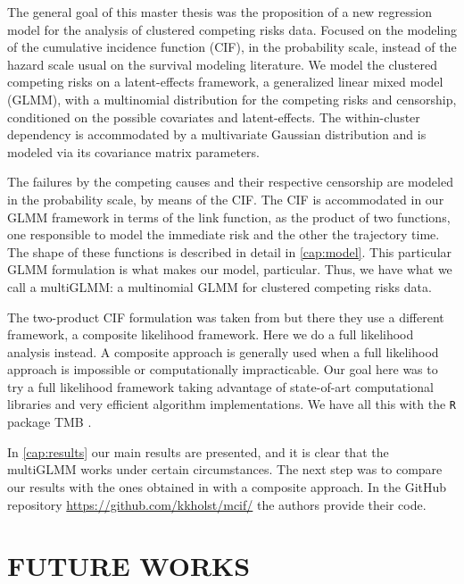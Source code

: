 The general goal of this master thesis was the proposition of a new
regression model for the analysis of clustered competing risks
data. Focused on the modeling of the cumulative incidence function
(CIF), in the probability scale, instead of the hazard scale usual on
the survival modeling literature. We model the clustered competing risks
on a latent-effects framework, a generalized linear mixed model (GLMM),
with a multinomial distribution for the competing risks and censorship,
conditioned on the possible covariates and latent-effects. The
within-cluster dependency is accommodated by a multivariate Gaussian
distribution and is modeled via its covariance matrix parameters.

The failures by the competing causes and their respective censorship are
modeled in the probability scale, by means of the CIF. The CIF is
accommodated in our GLMM framework in terms of the link function, as the
product of two functions, one responsible to model the immediate risk
and the other the trajectory time. The shape of these functions is
described in detail in \autoref{cap:model}. This particular GLMM
formulation is what makes our model, particular. Thus, we have what we
call a multiGLMM: a multinomial GLMM for clustered competing risks data.

The two-product CIF formulation was taken from  but
there they use a different framework, a composite likelihood
framework. Here we do a full likelihood analysis instead. A composite
approach is generally used when a full likelihood approach is impossible
or computationally impracticable. Our goal here was to try a full
likelihood framework taking advantage of state-of-art computational
libraries and very efficient algorithm implementations. We have all this
with the \texttt{R} \cite{R21} package TMB \cite{TMB}.

In \autoref{cap:results} our main results are presented, and it is clear
that the multiGLMM works under certain circumstances. The next step was
to compare our results with the ones obtained in 
with a composite approach. In the GitHub repository
\url{https://github.com/kkholst/mcif/} the authors provide their code.

\section{FUTURE WORKS}
\label{cap:future}

